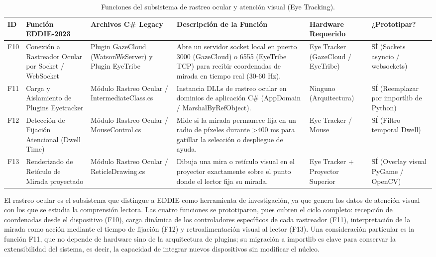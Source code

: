 \begin{table}[H]
    \centering
    \caption{Funciones del subsistema de rastreo ocular y atención visual (Eye Tracking).}
    \label{tab:func_rastreo_ocular}
    \begin{small}
    \begin{tabular}{|L{0.6cm}|L{2.2cm}|L{2.2cm}|L{4.1cm}|L{1.6cm}|L{1.8cm}|}
        \hline
        \textbf{ID} & \textbf{Función EDDIE-2023} & \textbf{Archivos C\# Legacy} & \textbf{Descripción de la Función} & \textbf{Hardware Requerido} & \textbf{¿Prototipar?} \\ \hline
        F10 & Conexión a Rastreador Ocular por Socket / WebSocket & Plugin GazeCloud (WatsonWsServer) y Plugin EyeTribe & Abre un servidor socket local en puerto 3000 (GazeCloud) o 6555 (EyeTribe TCP) para recibir coordenadas de mirada en tiempo real (30-60 Hz). & Eye Tracker (GazeCloud / EyeTribe) & SÍ (Sockets  asyncio / websockets) \\ \hline
        F11 & Carga y Aislamiento de Plugins Eyetracker & Módulo Rastreo Ocular / IntermediateClass.cs & Instancia DLLs de rastreo ocular en dominios de aplicación C\# (AppDomain / MarshalByRefObject). & Ninguno (Arquitectura) & SÍ (Reemplazar por importlib de Python) \\ \hline
        F12 & Detección de Fijación Atencional (Dwell Time) & Módulo Rastreo Ocular / MouseControl.cs & Mide si la mirada permanece fija en un radio de píxeles durante >400 ms para gatillar la selección o despliegue de ayuda. & Eye Tracker / Mouse & SÍ (Filtro temporal Dwell) \\ \hline
        F13 & Renderizado de Retículo de Mirada proyectado & Módulo Rastreo Ocular / ReticleDrawing.cs & Dibuja una mira o retículo visual en el proyector exactamente sobre el punto donde el lector fija su mirada. & Eye Tracker + Proyector Superior & SÍ (Overlay visual PyGame / OpenCV) \\ \hline
    \end{tabular}
    \end{small}
\end{table}
 
El rastreo ocular es el subsistema que distingue a EDDIE como herramienta de investigación, ya que genera los datos de atención visual con los que se estudia la comprensión lectora. Las cuatro funciones se prototiparon, pues cubren el ciclo completo: recepción de coordenadas desde el dispositivo (F10), carga dinámica de los controladores específicos de cada rastreador (F11), interpretación de la mirada como acción mediante el tiempo de fijación (F12) y retroalimentación visual al lector (F13). Una consideración particular es la función F11, que no depende de hardware sino de la arquitectura de plugins; su migración a importlib es clave para conservar la extensibilidad del sistema, es decir, la capacidad de integrar nuevos dispositivos sin modificar el núcleo.
 
